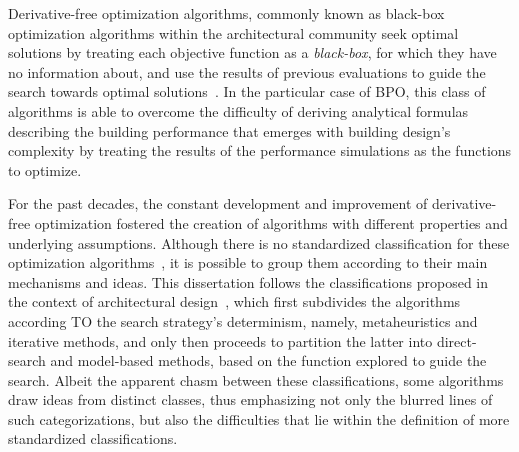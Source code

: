 	
	Derivative-free optimization algorithms, commonly known as black-box optimization algorithms within the architectural community \cite{Wortmann2016BBO} seek optimal solutions by treating each objective function as a \textit{black-box}, for which they have no information about, and use the results of previous evaluations to guide the search towards optimal solutions~\cite{Rios2013}. In the particular case of \ac{BPO}, this class of algorithms is able to overcome the difficulty of deriving analytical formulas describing the building performance that emerges with building design's complexity \cite{Machairas2014} by treating the results of the performance simulations as the functions to optimize. %
		
	For the past decades, the constant development and improvement of derivative-free optimization fostered the creation of algorithms with different properties and underlying assumptions. Although there is no standardized classification for these optimization algorithms~\cite{Rios2013, Wortmann2017ADO}, it is possible to group them according to their main mechanisms and ideas. This dissertation follows the classifications proposed in the context of architectural design~\cite{Wortmann2015AdvSBO}, which first subdivides the algorithms according TO the search strategy's determinism, namely, metaheuristics and iterative methods, and only then proceeds to partition the latter into direct-search and model-based methods, based on the function explored to guide the search. Albeit the apparent chasm between these classifications, some algorithms draw ideas from distinct classes, thus emphasizing not only the blurred lines of such categorizations, but also the difficulties that lie within the definition of more standardized classifications. 
	
